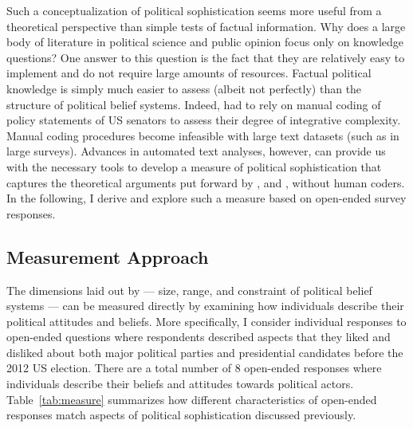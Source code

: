 \documentclass[12pt]{article}
\begin{document}
Such a conceptualization of political sophistication seems more useful from a theoretical perspective than simple tests of factual information. Why does a large body of literature in political science and public opinion focus only on knowledge questions? One answer to this question is the fact that they are relatively easy to implement and do not require large amounts of resources. Factual political knowledge is simply much easier to assess (albeit not perfectly) than the structure of political belief systems. Indeed, \citet{tetlock1983cognitive} had to rely on manual coding of policy statements of US senators to assess their degree of integrative complexity. Manual coding procedures become infeasible with large text datasets (such as in large surveys). Advances in automated text analyses, however, can provide us with the necessary tools to develop a measure of political sophistication that captures the theoretical arguments put forward by \citet{converse1964nature}, \citet{tetlock1983cognitive} and \citet{luskin1987measuring}, without human coders. In the following, I derive and explore such a measure based on open-ended survey responses.


\subsection{Measurement Approach}

The dimensions laid out by \citet{luskin1987measuring} --- size, range, and constraint of political belief systems --- can be measured directly by examining how individuals describe their political attitudes and beliefs. More specifically, I consider individual responses to open-ended questions where respondents described aspects that they liked and disliked about both major political parties and presidential candidates before the 2012 US election. There are a total number of 8 open-ended responses where individuals describe their beliefs and attitudes towards political actors. Table~\ref{tab:measure} summarizes how different characteristics of open-ended responses match aspects of political sophistication discussed previously.
\end{document}
